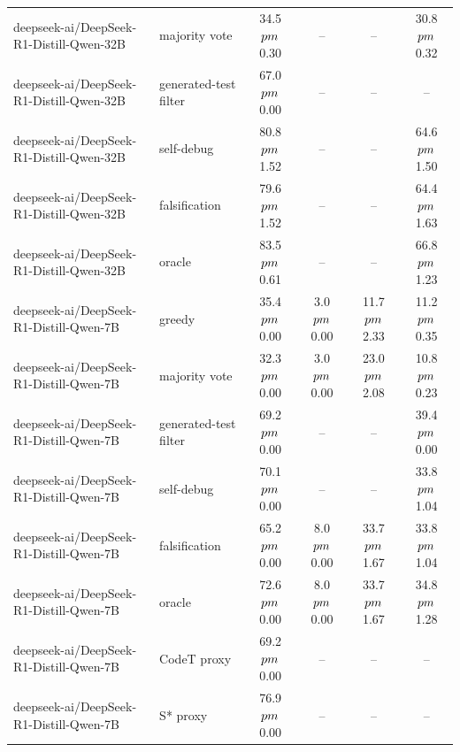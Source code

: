 \begin{tabular}{llcccc}
deepseek-ai/DeepSeek-R1-Distill-Qwen-32B & majority vote & 34.5 $\\pm$ 0.30 & -- & -- & 30.8 $\\pm$ 0.32 \\
deepseek-ai/DeepSeek-R1-Distill-Qwen-32B & generated-test filter & 67.0 $\\pm$ 0.00 & -- & -- & -- \\
deepseek-ai/DeepSeek-R1-Distill-Qwen-32B & self-debug & 80.8 $\\pm$ 1.52 & -- & -- & 64.6 $\\pm$ 1.50 \\
deepseek-ai/DeepSeek-R1-Distill-Qwen-32B & falsification & 79.6 $\\pm$ 1.52 & -- & -- & 64.4 $\\pm$ 1.63 \\
deepseek-ai/DeepSeek-R1-Distill-Qwen-32B & oracle & 83.5 $\\pm$ 0.61 & -- & -- & 66.8 $\\pm$ 1.23 \\
deepseek-ai/DeepSeek-R1-Distill-Qwen-7B & greedy & 35.4 $\\pm$ 0.00 & 3.0 $\\pm$ 0.00 & 11.7 $\\pm$ 2.33 & 11.2 $\\pm$ 0.35 \\
deepseek-ai/DeepSeek-R1-Distill-Qwen-7B & majority vote & 32.3 $\\pm$ 0.00 & 3.0 $\\pm$ 0.00 & 23.0 $\\pm$ 2.08 & 10.8 $\\pm$ 0.23 \\
deepseek-ai/DeepSeek-R1-Distill-Qwen-7B & generated-test filter & 69.2 $\\pm$ 0.00 & -- & -- & 39.4 $\\pm$ 0.00 \\
deepseek-ai/DeepSeek-R1-Distill-Qwen-7B & self-debug & 70.1 $\\pm$ 0.00 & -- & -- & 33.8 $\\pm$ 1.04 \\
deepseek-ai/DeepSeek-R1-Distill-Qwen-7B & falsification & 65.2 $\\pm$ 0.00 & 8.0 $\\pm$ 0.00 & 33.7 $\\pm$ 1.67 & 33.8 $\\pm$ 1.04 \\
deepseek-ai/DeepSeek-R1-Distill-Qwen-7B & oracle & 72.6 $\\pm$ 0.00 & 8.0 $\\pm$ 0.00 & 33.7 $\\pm$ 1.67 & 34.8 $\\pm$ 1.28 \\
deepseek-ai/DeepSeek-R1-Distill-Qwen-7B & CodeT proxy & 69.2 $\\pm$ 0.00 & -- & -- & -- \\
deepseek-ai/DeepSeek-R1-Distill-Qwen-7B & S* proxy & 76.9 $\\pm$ 0.00 & -- & -- & -- \\
\bottomrule
\end{tabular}
